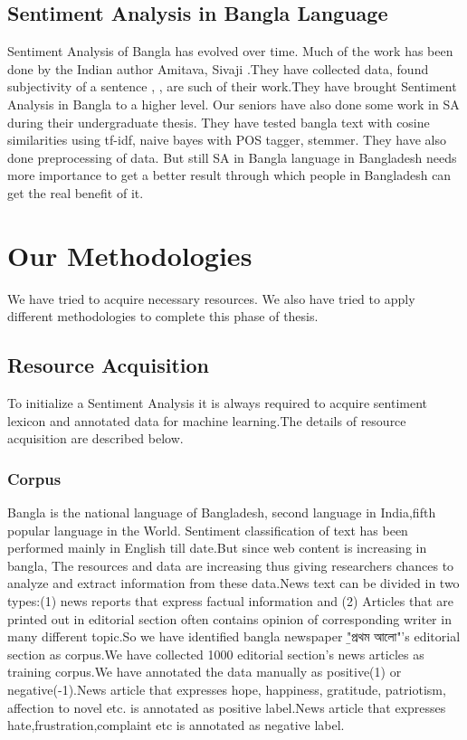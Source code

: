 \documentclass[a4paper,12pt]{report}
\begin{document}
\section{Sentiment Analysis in Bangla Language}
Sentiment Analysis of Bangla has evolved over time. Much of the work has been done by the Indian author Amitava, Sivaji \citep{Das, Amitava}.They have collected data, found subjectivity of a sentence , \citep{das2011dr}, \citep{das2010sentiwordnet} are such of their work.They have brought Sentiment Analysis in Bangla to a higher level.
Our seniors have also done some work in SA during their undergraduate thesis. They have tested bangla text with cosine similarities using tf-idf, naive bayes with POS tagger, stemmer. They have also done preprocessing of data. But still SA in Bangla language in Bangladesh needs more importance to get a better result through which people in Bangladesh can get the real benefit of it.



\chapter{Our Methodologies}
We have tried to acquire necessary resources. We also have tried to apply different methodologies to complete this phase of thesis.
\section{Resource Acquisition}
To initialize a Sentiment Analysis it is always required to acquire sentiment lexicon and annotated data for machine learning.The details of resource acquisition are described below.
\subsection{Corpus}
Bangla is the national language of Bangladesh, second language in India,fifth popular language in the World. Sentiment classification of text has been performed mainly in English till date.But since web content is increasing in bangla, The resources and data are increasing thus giving researchers chances to analyze and extract information from these data.News text can be divided in two types:(1) news reports that express factual information and (2) Articles that are printed out in editorial section often contains opinion of corresponding writer in many different topic.So we have identified bangla newspaper 
{\b "প্রথম আলো"'}s
 editorial section as corpus.We have collected 1000 editorial section's news articles as training corpus.We have annotated the data manually as positive(1) or negative(-1).News article that expresses hope, happiness, gratitude, patriotism, affection to novel etc. is annotated as positive label.News article that expresses hate,frustration,complaint etc is annotated as negative label.
 \\
\end{document}
